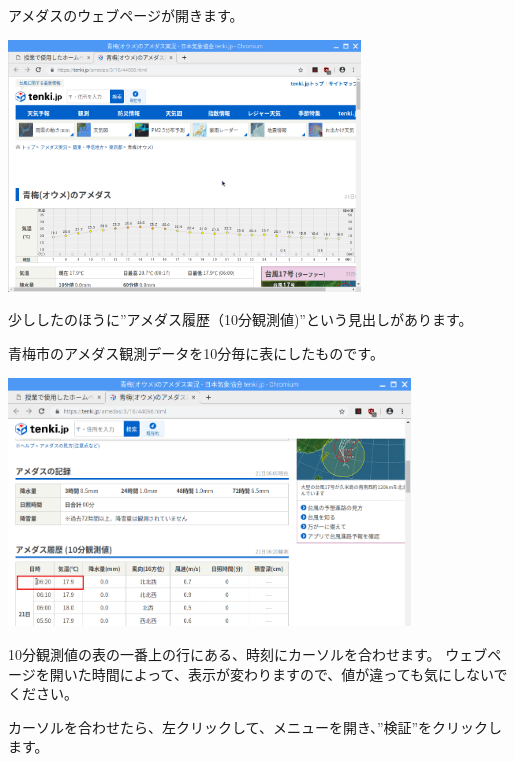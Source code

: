 アメダスのウェブページが開きます。

\begin{center}
\includegraphics[width=0.7\textwidth]{./text08-img/textbook-img028.png}

\end{center}


\clearpage
少ししたのほうに”アメダス履歴（10分観測値)”という見出しがあります。

青梅市のアメダス観測データを10分毎に表にしたものです。



\begin{center}
\includegraphics[width=0.8\textwidth]{./text08-img/textbook-img033.png}

\end{center}
10分観測値の表の一番上の行にある、時刻にカーソルを合わせます。
ウェブページを開いた時間によって、表示が変わりますので、値が違っても気にしないでください。

カーソルを合わせたら、左クリックして、メニューを開き、”検証”をクリックします。

